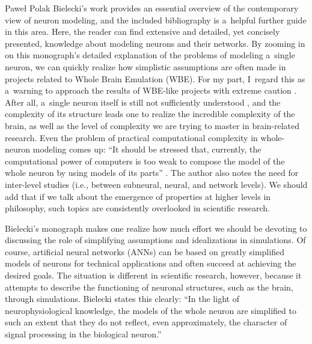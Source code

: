 \begin{newrevengenv}{Paweł Polak}
Bielecki's work provides an essential overview of the contemporary view of neuron modeling, and the included bibliography is a~helpful further guide in this area. Here, the reader can find extensive and detailed, yet concisely presented, knowledge about modeling neurons and their networks. By zooming in on this monograph's detailed explanation of the problems of modeling a~single neuron, we can quickly realize how simplistic assumptions are often made in projects related to Whole Brain Emulation (WBE). For my part, I~regard this as a~warning to approach the results of WBE-like projects with extreme caution
\parencite[e.g.][]{kycia_information_2021}. %
 After all, a~single neuron itself is still not sufficiently understood 
\parencite[e.g.][p.133]{bielecki_models_2019}, %
 and the complexity of its structure leads one to realize the incredible complexity of the brain, as well as the level of complexity we are trying to master in brain-related research. Even the problem of practical computational complexity in whole-neuron modeling comes up: ``It should be stressed that, currently, the computational power of computers is too weak to compose the model of the whole neuron by using models of its parts'' 
\parencite[][p.59]{bielecki_models_2019}. %
 The author also notes the need for inter-level studies (i.e., between subneural, neural, and network levels). We should add that if we talk about the emergence of properties at higher levels in philosophy, such topics are consistently overlooked in scientific research.

Bielecki's monograph makes one realize how much effort we should be devoting to discussing the role of simplifying assumptions and idealizations in simulations. Of course, artificial neural networks (ANNs) can be based on greatly simplified models of neurons for technical applications and often succeed at achieving the desired goals. The situation is different in scientific research, however, because it attempts to describe the functioning of neuronal structures, such as the brain, through simulations. Bielecki states this clearly: ``In the light of neurophysiological knowledge, the models of the whole neuron are simplified to such an extent that they do not reflect, even approximately, the character of signal processing in the biological neuron.''
\parencite[][p.57]{bielecki_models_2019}%



\end{newrevengenv}
